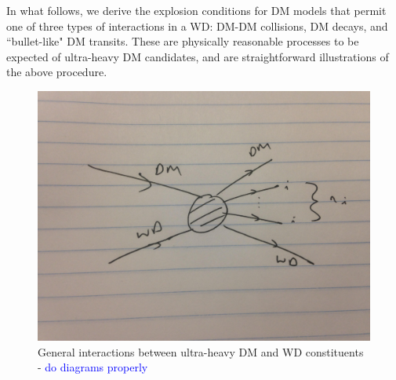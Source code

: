 \documentclass[twocolumn,showpacs,preprintnumbers,amsmath,amssymb,prd]{revtex4}
\begin{document}
In what follows, we derive the explosion conditions for DM models that permit one of three types of interactions in a WD: DM-DM collisions, DM decays, and ``bullet-like" DM transits. These are physically reasonable processes to be expected of ultra-heavy DM candidates, and are straightforward illustrations of the above procedure. 

\begin{figure}
\includegraphics[scale=.05]{feynmandiag}
\caption{General interactions between ultra-heavy DM and WD constituents - \textcolor{blue}{do diagrams properly}}
\label{fig:feynman}
\end{figure}
\end{document}
